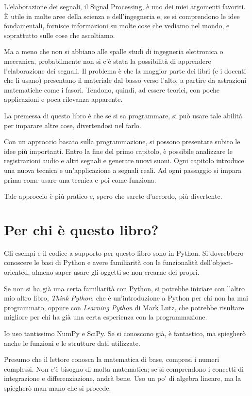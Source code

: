 \documentclass[12pt,a4paper]{book}
\begin{document}
L'elaborazione dei segnali, il Signal Processing, è uno dei miei argomenti favoriti. È utile in molte aree della scienza e dell'ingegneria e, se si comprendono le idee fondamentali, fornisce informazioni su molte cose che vediamo nel mondo, e soprattutto sulle cose che ascoltiamo.

Ma a meno che non si abbiano alle spalle studi di ingegneria elettronica o meccanica, probabilmente non si c'è stata la possibilità di apprendere l'elaborazione dei segnali. Il problema è che la maggior parte dei libri (e i docenti che li usano) presentano il materiale dal basso verso l'alto, a partire da astrazioni matematiche come i fasori. Tendono, quindi, ad essere teorici, con poche applicazioni e poca rilevanza apparente.

La premessa di questo libro è che se si sa programmare, si può usare tale abilità per imparare altre cose, divertendosi nel farlo.

Con un approccio basato sulla programmazione, si possono presentare subito le idee più importanti. Entro la fine del primo capitolo, è possibile analizzare le registrazioni audio e altri segnali e generare nuovi suoni. Ogni capitolo introduce una nuova tecnica e un'applicazione a segnali reali. Ad ogni passaggio si impara prima come usare una tecnica e poi come funziona.

Tale approccio è più pratico e, spero che sarete d'accordo, più divertente.

\section{Per chi è questo libro?} 

Gli esempi e il codice a supporto per questo libro sono in Python. Si dovrebbero conoscere le basi di Python e avere familiarità con le funzionalità dell'object-oriented, almeno saper usare gli oggetti se non crearne dei propri.

Se non si ha già una certa familiarità con Python, si potrebbe iniziare con l'altro mio altro libro, {\it Think Python}, che è un'introduzione a Python per chi non ha mai programmato, oppure con {\it Learning Python} di Mark Lutz, che potrebbe risultare migliore per chi ha già una certa esperienza con la programmazione.

Io uso tantissimo NumPy e SciPy. Se si conoscono già, è fantastico, ma spiegherò anche le funzioni e le strutture dati utilizzate.

Presumo che il lettore conosca la matematica di base, compresi i numeri complessi. Non c'è bisogno di molta matematica; se si comprendono i concetti di integrazione e differenziazione, andrà bene. Uso un po' di algebra lineare, ma la spiegherò man mano che si procede.
\end{document}
